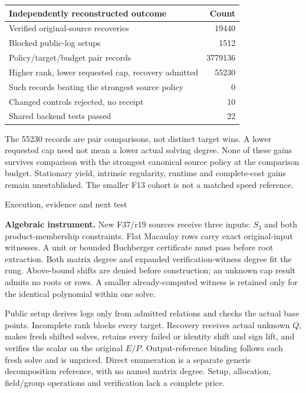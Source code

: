 \documentclass[11pt]{article}
\begin{document}
\begin{center}\begin{tabular}{lr}\toprule
Independently reconstructed outcome & Count\\\midrule
Verified original-source recoveries &19440\\
Blocked public-log setups &1512\\
Policy/target/budget pair records &3779136\\
Higher rank, lower requested cap, recovery admitted &55230\\
Such records beating the strongest source policy &0\\
Changed controls rejected, no receipt &10\\
Shared backend tests passed &22\\\bottomrule\end{tabular}\end{center}

The 55230 records are pair comparisons, not distinct target wins. A lower
requested cap need not mean a lower actual solving degree. None of these gains
survives comparison with the strongest canonical source policy at the comparison
budget. Stationary yield, intrinsic regularity, runtime and complete-cost gains
remain unestablished. The smaller F13 cohort is not a matched speed reference.

\clearpage
{\Large Execution, evidence and next test}

\textbf{Algebraic instrument.} New F37/r19 sources receive three inputs:
$S_3$ and both product-membership constraints. Flat Macaulay rows carry exact
original-input witnesses. A unit or bounded Buchberger certificate must pass
before root extraction. Both matrix degree and expanded verification-witness
degree fit the rung. Above-bound shifts are denied before construction; an
unknown cap result admits no roots or rows. A smaller already-computed witness
is retained only for the identical polynomial within one solve.

Public setup derives logs only from admitted relations and checks the actual
base points. Incomplete rank blocks every target. Recovery receives actual
unknown $Q$, makes fresh shifted solves, retains every failed or identity shift
and sign lift, and verifies the scalar on the original $E/P$. Output-reference
binding follows each fresh solve and is unpriced. Direct enumeration is a
separate generic decomposition reference, with no named matrix degree.
Setup, allocation, field/group operations and verification lack a complete price.
\end{document}
